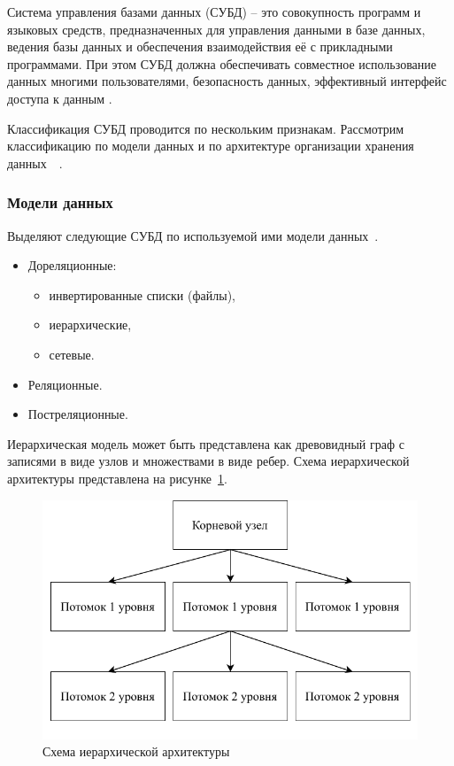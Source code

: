 Система управления базами данных (СУБД) -- это совокупность программ и языковых средств, предназначенных для управления данными в базе данных, ведения базы данных и обеспечения взаимодействия её с прикладными программами. При этом СУБД должна обеспечивать совместное использование данных многими пользователями, безопасность данных, эффективный интерфейс доступа к данным \cite{karpova-db-textbook-2009}.

Классификация СУБД проводится по нескольким признакам. 
Рассмотрим классификацию по модели данных и по архитектуре организации хранения данных~\cite{karpova-db-textbook-2009}~\cite{guschin-db-2015}.

\subsubsection{Модели данных}
Выделяют следующие СУБД по используемой ими модели данных~\cite{guschin-db-2015}.
\begin{itemize}[label=---]
	\item Дореляционные:
	
	\begin{itemize}[label=---]
		\item инвертированные списки (файлы),
		
		\item иерархические,
		
		\item сетевые.
	\end{itemize}
	
	\item Реляционные.
	
	\item Постреляционные.
\end{itemize}

Иерархическая модель может быть представлена как древовидный граф с записями в виде узлов и множествами в виде ребер.
Схема иерархической архитектуры представлена на рисунке~\ref{ierarch}.
\pagebreak

\begin{figure}[ht!]
	\centering
	\includegraphics[scale=1]{img/ierarch.pdf}
	\caption{Схема иерархической архитектуры}
	\label{ierarch}
\end{figure}

